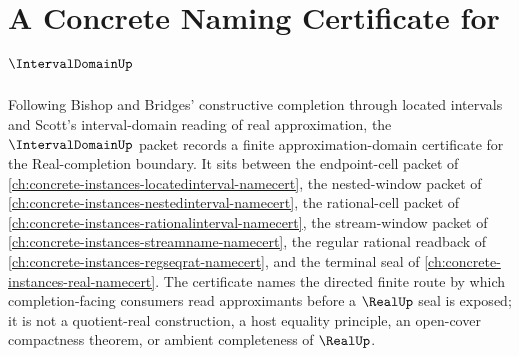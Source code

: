 \chapter{A Concrete Naming Certificate for $\IntervalDomainUp$}
\label{ch:concrete-instances-intervaldomain-namecert}

Following Bishop and Bridges' constructive completion through located intervals and Scott's interval-domain reading of real approximation, the $\IntervalDomainUp$ packet records a finite approximation-domain certificate for the Real-completion boundary. It sits between the endpoint-cell packet of \autoref{ch:concrete-instances-locatedinterval-namecert}, the nested-window packet of \autoref{ch:concrete-instances-nestedinterval-namecert}, the rational-cell packet of \autoref{ch:concrete-instances-rationalinterval-namecert}, the stream-window packet of \autoref{ch:concrete-instances-streamname-namecert}, the regular rational readback of \autoref{ch:concrete-instances-regseqrat-namecert}, and the terminal seal of \autoref{ch:concrete-instances-real-namecert}. The certificate names the directed finite route by which completion-facing consumers read approximants before a $\RealUp$ seal is exposed; it is not a quotient-real construction, a host equality principle, an open-cover compactness theorem, or ambient completeness of $\RealUp$.

